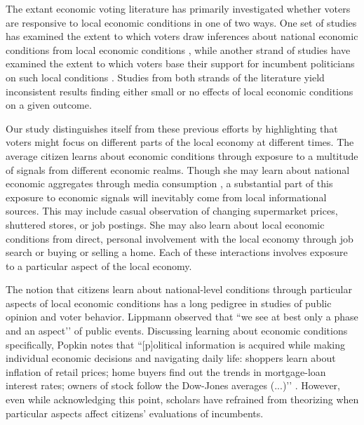 \documentclass[12pt,a4paper]{article}
\begin{document}
	The extant economic voting literature has primarily investigated whether voters are responsive to local economic conditions in one of two ways. One set of studies has examined the extent to which voters draw inferences about national economic conditions from local economic conditions \citep{books1999contextual,reeves2012ecologies,anderson2011local,ansolabehere2014mecro,bisgaard2016reconsidering}, while another strand of studies have examined the extent to which voters base their support for incumbent politicians on such local conditions \citep{hansford2015reevaluating,eisenberg2004economic,kim2003spatial,healy2017presidential, hall2017economic,elinder2010local,auberger2005influence}. Studies from both strands of the literature yield inconsistent results finding either small or no effects of local economic conditions on a given outcome.   
	
	Our study distinguishes itself from these previous efforts by highlighting that voters might focus on different parts of the local economy at different times. The average citizen learns about economic conditions through exposure to a multitude of signals from different economic realms. Though she may learn about national economic aggregates through media consumption \citep{soroka2015s}, a substantial part of this exposure to economic signals will inevitably come from local informational sources. This may include casual observation of changing supermarket prices, shuttered stores, or job postings. She may also learn about local economic conditions from direct, personal involvement with the local economy through job search or buying or selling a home. Each of these interactions involves exposure to a particular aspect of the local economy.
	
	The notion that citizens learn about national-level conditions through particular aspects of local economic conditions has a long pedigree in studies of public opinion and voter behavior. Lippmann \citeyearpar[][p. 79]{lippmann1946public} observed that ``we see at best only a phase and an aspect’’ of public events. Discussing learning about economic conditions specifically, Popkin \citeyearpar[][p. 24]{popkin1994reasoning} notes that ``[p]olitical information is acquired while making individual economic decisions and navigating daily life: shoppers learn about inflation of retail prices; home buyers find out the trends in mortgage-loan interest rates; owners of stock follow the Dow-Jones averages (...)’’ \cite[see also][p. 5]{fiorina1981retrospective}. However, even while acknowledging this point, scholars have refrained from theorizing when particular aspects affect citizens’ evaluations of incumbents. 
	
\end{document}
